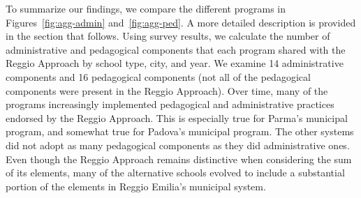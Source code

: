 To summarize our findings, we compare the different programs in Figures~\ref{fig:agg-admin} and~\ref{fig:agg-ped}. A more detailed description is provided in the section that follows. Using survey results, we calculate the number of administrative and pedagogical components that each program shared with the Reggio Approach by school type, city, and year. We examine 14 administrative components and 16 pedagogical components (not all of the pedagogical components were present in the Reggio Approach). Over time, many of the programs increasingly implemented pedagogical and administrative practices endorsed by the Reggio Approach. This is especially true for Parma's municipal program, and somewhat true for Padova's municipal program. The other systems did not adopt as many pedagogical components as they did administrative ones. Even though the Reggio Approach remains distinctive when considering the sum of its elements, many of the alternative schools evolved to include a substantial portion of the elements in Reggio Emilia's municipal system.

